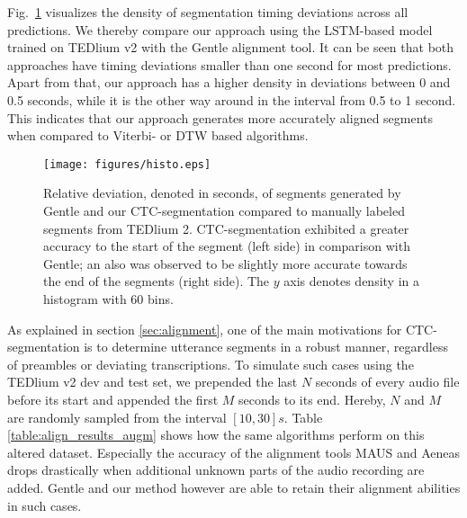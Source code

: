 \documentclass[runningheads]{llncs}
\begin{document}
Fig.~\ref{fig:alignment_density} visualizes the density of segmentation timing deviations across all predictions.
We thereby compare our approach using the LSTM-based model trained on TEDlium v2 with the Gentle alignment tool.
It can be seen that both approaches have timing deviations smaller than one second for most predictions.
Apart from that, our approach has a higher density in deviations between 0 and 0.5 seconds, while it is the other way around in the interval from 0.5 to 1 second.
This indicates that our approach generates more accurately aligned segments when compared to Viterbi- or DTW based algorithms.
\begin{figure}[tbp]
  \centering
  \texttt{[image: figures/histo.eps]}
  \caption{Relative deviation, denoted in seconds, of segments generated by Gentle and our CTC-segmentation compared to manually labeled segments from TEDlium 2.
  CTC-segmentation exhibited a greater accuracy to the start of the segment (left side) in comparison with Gentle;
  an also was observed to be slightly more accurate towards the end of the segments (right side).
  The $y$ axis denotes density in a histogram with $60$ bins.}
  \label{fig:alignment_density}
\end{figure}

As explained in section \ref{sec:alignment}, one of the main motivations for CTC-segmentation is to determine utterance segments in a robust manner, regardless of preambles or deviating transcriptions.
To simulate such cases using the TEDlium v2 dev and test set,
we prepended the last $N$ seconds of every audio file before its start and appended the first $M$ seconds to its end.
Hereby, $N$ and $M$ are randomly sampled from the interval $[10, 30]s$.
Table \ref{table:align_results_augm} shows how the same algorithms perform on this altered dataset.
Especially the accuracy of the alignment tools MAUS and Aeneas drops drastically when additional unknown parts of the audio recording are added.
Gentle and our method however are able to retain their alignment abilities in such cases.
\end{document}
